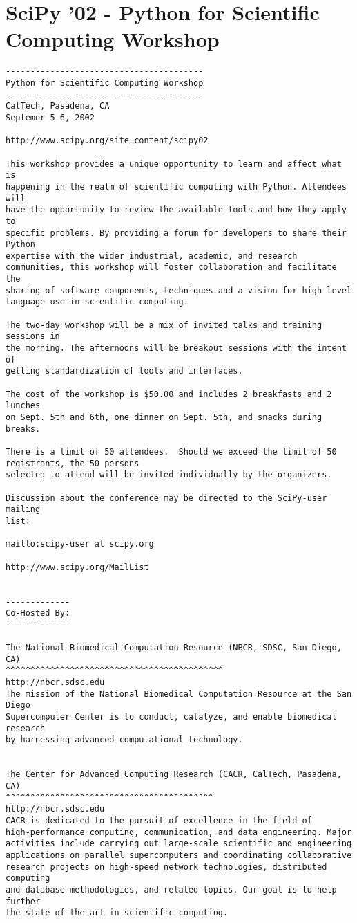 \newpage
\section*{SciPy '02 - Python for Scientific Computing Workshop}

\begin{verbatim}
----------------------------------------
Python for Scientific Computing Workshop
----------------------------------------
CalTech, Pasadena, CA
Septemer 5-6, 2002

http://www.scipy.org/site_content/scipy02

This workshop provides a unique opportunity to learn and affect what is
happening in the realm of scientific computing with Python. Attendees will
have the opportunity to review the available tools and how they apply to
specific problems. By providing a forum for developers to share their Python
expertise with the wider industrial, academic, and research
communities, this workshop will foster collaboration and facilitate the
sharing of software components, techniques and a vision for high level
language use in scientific computing.

The two-day workshop will be a mix of invited talks and training sessions in
the morning. The afternoons will be breakout sessions with the intent of
getting standardization of tools and interfaces.

The cost of the workshop is $50.00 and includes 2 breakfasts and 2 lunches
on Sept. 5th and 6th, one dinner on Sept. 5th, and snacks during breaks.

There is a limit of 50 attendees.  Should we exceed the limit of 50
registrants, the 50 persons
selected to attend will be invited individually by the organizers.

Discussion about the conference may be directed to the SciPy-user mailing
list:

mailto:scipy-user at scipy.org

http://www.scipy.org/MailList


-------------
Co-Hosted By:
-------------

The National Biomedical Computation Resource (NBCR, SDSC, San Diego, CA)
^^^^^^^^^^^^^^^^^^^^^^^^^^^^^^^^^^^^^^^^^^^^
http://nbcr.sdsc.edu
The mission of the National Biomedical Computation Resource at the San Diego
Supercomputer Center is to conduct, catalyze, and enable biomedical research
by harnessing advanced computational technology.


The Center for Advanced Computing Research (CACR, CalTech, Pasadena, CA)
^^^^^^^^^^^^^^^^^^^^^^^^^^^^^^^^^^^^^^^^^^
http://nbcr.sdsc.edu
CACR is dedicated to the pursuit of excellence in the field of
high-performance computing, communication, and data engineering. Major
activities include carrying out large-scale scientific and engineering
applications on parallel supercomputers and coordinating collaborative
research projects on high-speed network technologies, distributed computing
and database methodologies, and related topics. Our goal is to help further
the state of the art in scientific computing.



\end{verbatim}
